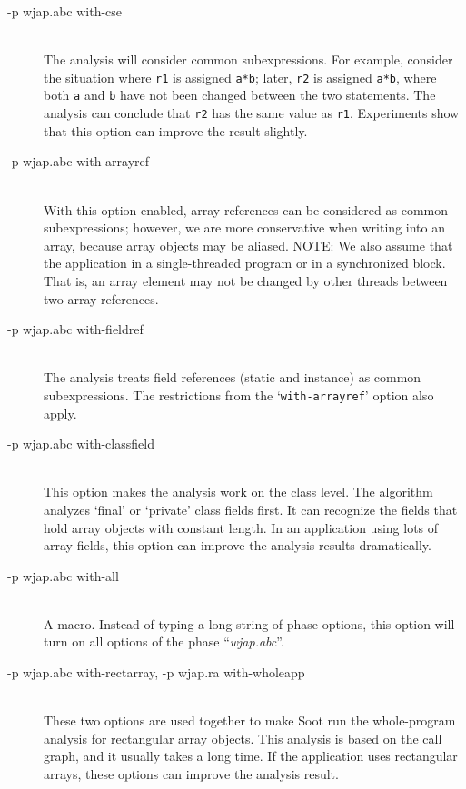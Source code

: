 \documentclass{article}
\begin{document}
\begin{description}

\item[-p wjap.abc with-cse]\ \\
The analysis will consider common subexpressions.  For example,
  consider the situation where {\tt r1} is assigned {\tt a*b}; later,
  {\tt r2} is assigned {\tt a*b}, where both {\tt a} and {\tt b} have
  not been changed between the two statements. The analysis can
  conclude that {\tt r2} has the same value as {\tt r1}. Experiments
  show that this option can improve the result slightly.

\item[-p wjap.abc with-arrayref]\ \\ With this option enabled, array
references can be considered as common subexpressions; however, we are
more conservative when writing into an array, because array
objects may be aliased. NOTE: We also assume that the application in a
single-threaded program or in a synchronized block. That is, an
array element may not be changed by other threads between two array
references.

\item[-p wjap.abc with-fieldref]\ \\
The analysis treats field references (static and instance) as common
subexpressions. The restrictions from the `{\tt with-arrayref}' option also
apply. 

\item[-p wjap.abc with-classfield]\ \\
This option makes the analysis work on the class level. The algorithm 
analyzes `final' or `private' class fields first. It can recognize
the fields that hold array objects with constant length.  In an application 
using lots of array fields, this option can improve the analysis results 
dramatically. 

\item[-p wjap.abc with-all]\ \\
A macro.  Instead of typing a long string of phase options, this option 
will turn on all options of the phase ``{\em wjap.abc}''.
 
\item[-p wjap.abc with-rectarray, -p wjap.ra with-wholeapp]\ \\ These
two options are used together to make Soot run the whole-program
analysis for rectangular array objects. This analysis is based on the
call graph, and it usually takes a long time. If the application uses
rectangular arrays, these options can improve the analysis
result.

\end{description}
\end{document}
